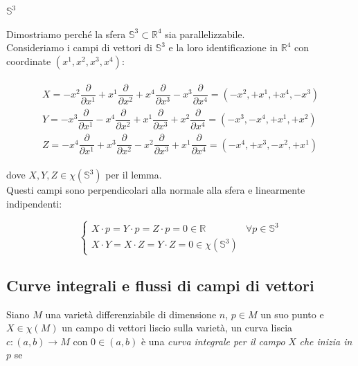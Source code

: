 \paragraph{$ \mathbb{S}^{3} $}

Dimostriamo perché la sfera $ \mathbb{S}^{3} \subset \mathbb{R}^{4} $ sia parallelizzabile.\\
Consideriamo i campi di vettori di $ \mathbb{S}^{3} $ e la loro identificazione in $ \mathbb{R}^{4} $ con coordinate $ (x^{1},x^{2},x^{3},x^{4}) $:

\begin{align}
	\begin{split}
		X = - x^{2} \dfrac{\partial}{\partial x^{1}} + x^{1} \dfrac{\partial}{\partial x^{2}} + x^{4} \dfrac{\partial}{\partial x^{3}} - x^{3} \dfrac{\partial}{\partial x^{4}} = (-x^{2}, +x^{1}, +x^{4}, -x^{3})\\
		Y = - x^{3} \dfrac{\partial}{\partial x^{1}} - x^{4} \dfrac{\partial}{\partial x^{2}} + x^{1} \dfrac{\partial}{\partial x^{3}} + x^{2} \dfrac{\partial}{\partial x^{4}} = (-x^{3}, -x^{4}, +x^{1}, +x^{2})\\
		Z = - x^{4} \dfrac{\partial}{\partial x^{1}} + x^{3} \dfrac{\partial}{\partial x^{2}} - x^{2} \dfrac{\partial}{\partial x^{3}} + x^{1} \dfrac{\partial}{\partial x^{4}} = (-x^{4}, +x^{3}, -x^{2}, +x^{1})
	\end{split}
\end{align}

dove $ X,Y,Z \in \chi(\mathbb{S}^{3}) $ per il lemma.\\
Questi campi sono perpendicolari alla normale alla sfera e linearmente indipendenti:

\begin{equation}
	\begin{cases}
		X \cdot p = Y \cdot p = Z \cdot p = 0 \in \mathbb{R} & \forall p \in \mathbb{S}^{3}\\
		X \cdot Y = X \cdot Z = Y \cdot Z = 0 \in \chi(\mathbb{S}^{3})
	\end{cases}
\end{equation}

\subsection{Curve integrali e flussi di campi di vettori}

Siano $ M $ una varietà differenziabile di dimensione $ n $, $ p \in M $ un suo punto e $ X \in \chi(M) $ un campo di vettori liscio sulla varietà, un curva liscia $ c : (a,b) \to M $ con $ 0 \in (a,b) $ è una \textit{curva integrale per il campo} $ X $ \textit{che inizia in} $ p $ se

